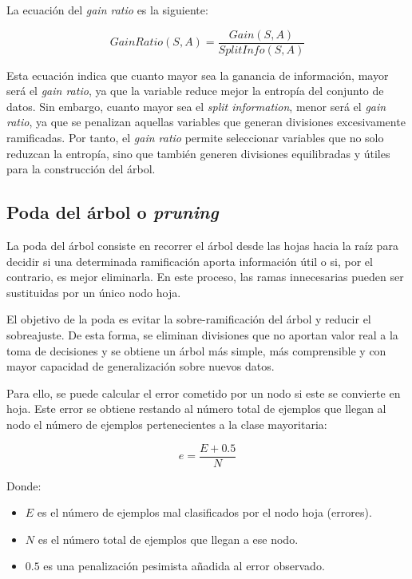 La ecuación del \textit{gain ratio} es la siguiente:

\begin{equation}
GainRatio(S, A) = \frac{Gain(S, A)}{SplitInfo(S, A)}
\label{eq:gain_ratio}
\end{equation}

Esta ecuación indica que cuanto mayor sea la ganancia de información, mayor será el \textit{gain ratio}, ya que la variable reduce mejor la entropía del conjunto de datos. Sin embargo, cuanto mayor sea el \textit{split information}, menor será el \textit{gain ratio}, ya que se penalizan aquellas variables que generan divisiones excesivamente ramificadas. Por tanto, el \textit{gain ratio} permite seleccionar variables que no solo reduzcan la entropía, sino que también generen divisiones equilibradas y útiles para la construcción del árbol.

\subsection{\textbf{Poda del árbol o \textit{pruning}}}

La poda del árbol \cite{2014ExpPoda} consiste en recorrer el árbol desde las hojas hacia la raíz para decidir si una determinada ramificación aporta información útil o si, por el contrario, es mejor eliminarla. En este proceso, las ramas innecesarias pueden ser sustituidas por un único nodo hoja.

El objetivo de la poda es evitar la sobre-ramificación del árbol y reducir el sobreajuste. De esta forma, se eliminan divisiones que no aportan valor real a la toma de decisiones y se obtiene un árbol más simple, más comprensible y con mayor capacidad de generalización sobre nuevos datos.

Para ello, se puede calcular el error cometido por un nodo si este se convierte en hoja. Este error se obtiene restando al número total de ejemplos que llegan al nodo el número de ejemplos pertenecientes a la clase mayoritaria:

\begin{equation}
    e = \frac{E + 0.5}{N}
\end{equation}

Donde:

\begin{itemize}
    \item $E$ es el número de ejemplos mal clasificados por el nodo hoja (errores).
    \item $N$ es el número total de ejemplos que llegan a ese nodo.
    \item $0.5$ es una penalización pesimista añadida al error observado.
\end{itemize}

